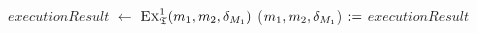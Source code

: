 \begin{algorithmic}[1]
            \State {}
        \EndIf
            \State $executionResult$ $\leftarrow$ $\textsc{Ex}_{\mathfrak{T}}^1(m_{1}, m_{2}, \delta_{M_{1}})$
                \State \Return{$\bot$} \label{algo:synchronization:executebidirectionaltransformation:line:returnbot}
            \Else
                \State ($m_{1}, m_{2}, \delta_{M_{1}}$) $:=$ $executionResult$
            \EndIf
        \EndWhile
        \State {} \label{algo:synchronization:executebidirectionaltransformation:line:returnresult}
    \EndProcedure
\end{algorithmic}